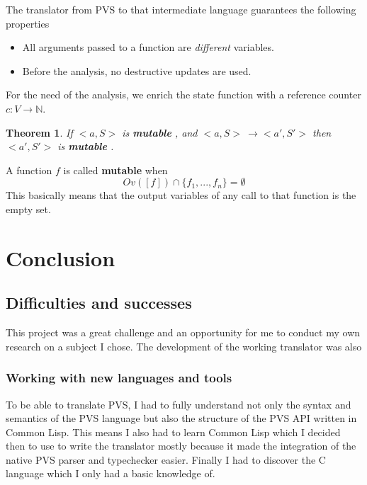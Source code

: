 \documentclass[12pt,a4paper]{article}
\newtheorem{theorem}{Theorem}
\newcommand{\N}{\mathbb{N}}
\newcommand{\mut}{  \textbf{ mutable } }
\newcommand{\bang}{ \textbf{ mutable } }
\begin{document}
The translator from PVS to that intermediate language guarantees the following properties 
\begin{itemize}
\item All arguments passed to a function are \emph{different} variables.
\item Before the analysis, no destructive updates are used.
\end{itemize} 

For the need of the analysis, we enrich the state function with a reference counter $c:V \rightarrow \N$.


\begin{theorem}
If $<a, S>$ is \mut, and $<a, S> \ \longrightarrow <a', S'>$ then $<a', S'>$ is \mut.
\end{theorem}


A function $f$ is called \bang when
$$ Ov([f]) \cap \{ f_1, ... , f_n \} = \emptyset $$
This basically means that the output variables of any call to that function is the empty set.









\newpage
\section{Conclusion}


\subsection{Difficulties and successes}

This project was a great challenge and an opportunity for me to conduct my own research on a subject I chose. The development of the working translator was also 


\subsubsection{Working with new languages and tools}

To be able to translate PVS, I had to fully understand not only the syntax and semantics of the PVS language but also the structure of the PVS API written in Common Lisp. This means I also had to learn Common Lisp which I decided then to use to write the translator mostly because it made the integration of the native PVS parser and typechecker easier. Finally I had to discover the C language which I only had a basic knowledge of.
\end{document}
